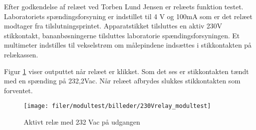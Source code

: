 
Efter godkendelse af relæet ved Torben Lund Jensen er relæets funktion testet. 
Laboratoriets spændingsforsyning er indstillet til 4 V og 100mA som er det relæet modtager fra tilslutningsprintet.
Apparatstikket tilsluttes en aktiv 230V stikkontakt, bananbøsningerne tilsluttes laboratorie spændingsforsyningen.
Et multimeter indstilles til vekselstrøm om målepindene indsættes i stikkontakten på relækassen. 

Figur \ref{lab:Relay_moduletest} viser outputtet når relæet er klikket. Som det ses er stikkontakten tændt med en spænding på 232,2Vac. Når relæet afbrydes slukkes stikkontakten som forventet.

\begin{figure}[htb]
\centering
{\texttt{[image: filer/modultest/billeder/230Vrelay\_modultest]}}
\caption{Aktivt relæ med 232 Vac på udgangen }
\label{lab:Relay_moduletest}
\end{figure}


